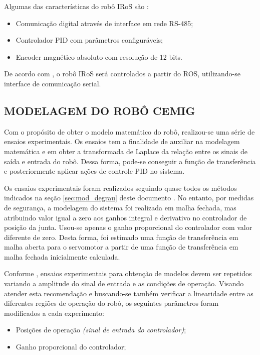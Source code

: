 \documentclass[12pt,oneside,a4paper, chapter=TITLE, section = TITLE, english, brazil]{abntex2}
\begin{document}
Algumas das características do robô IRoS são \cite{cemig}:

\begin{itemize}

\item Comunicação digital através de interface em rede RS-485;

\item Controlador PID com parâmetros configuráveis;
\item Encoder magnético absoluto com resolução de 12 bits.

\end{itemize}

De acordo com , o robô IRoS será controlados a partir do ROS, utilizando-se interface de comunicação serial.

\subsection{MODELAGEM DO ROBÔ CEMIG} %

Com o propósito de obter o modelo matemático do robô, realizou-se uma série de ensaios experimentais. Os ensaios tem a finalidade de auxiliar na modelagem matemática e em obter a transformada de Laplace da relação entre os sinais de saída e entrada do robô. Dessa forma, pode-se conseguir a função de transferência e posteriormente aplicar ações de controle PID no sistema.

Os ensaios experimentais foram realizados seguindo quase todos os métodos indicados na seção \ref{sec:mod_degrau} deste documento \cite{astrom}. No entanto, por medidas de segurança, a modelagem do sistema foi realizada em malha fechada, mas atribuindo valor igual a zero aos ganhos integral e derivativo no controlador de posição da junta. Usou-se apenas o ganho proporcional do controlador com valor diferente de zero. Desta forma, foi estimado uma função de transferência em malha aberta para o servomotor a partir de uma função de transferência em malha fechada inicialmente calculada.

Conforme , ensaios experimentais para obtenção de modelos devem ser repetidos variando a amplitude do sinal de entrada e as condições de operação. Visando atender esta recomendação e buscando-se também verificar a linearidade entre as diferentes regiões de operação do robô, os seguintes parâmetros foram modificados a cada experimento:\\

\begin{itemize}

\item Posições de operação \textit{(sinal de entrada do controlador)};

\item Ganho proporcional do controlador;\\

\end{itemize}
\end{document}
